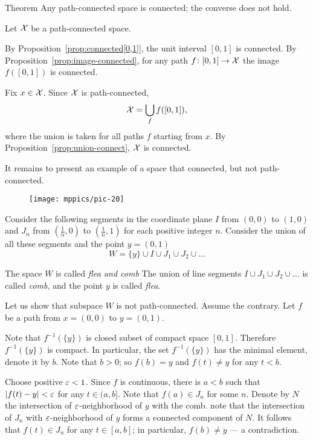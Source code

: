 \begin{thm}{Theorem}\label{thm:conncted/path-connected}
Any path-connected space is connected;
the converse does not hold.
\end{thm}

Let $\mathcal{X}$ be a path-connected space.

By Proposition~\ref{prop:connected[0,1]}, the unit interval $[0,1]$ is connected.
By Proposition~\ref{prop:image-connected}, for any path $f\colon[0,1]\to \mathcal{X}$ the image $f([0,1])$ is connected.

Fix $x\in \mathcal{X}$. 
Since $\mathcal{X}$ is path-connected, 
\[\mathcal{X}=\bigcup_f f([0,1]),\]
where the union is taken for all paths $f$ starting from $x$.
By Proposition~\ref{prop:union-connect}, $\mathcal{X}$ is connected.


It remains to present an example of a space that connected, but not path-connected.

\begin{wrapfigure}{r}{33mm}
\texttt{[image: mppics/pic-20]}
\end{wrapfigure}

Consider the following segments in the coordinate plane
$I$ from $(0,0)$ to $(1,0)$ 
and $J_n$ from $(\tfrac1n,0)$ to $(\tfrac1n,1)$ for each positive integer $n$.
Consider the union of all these segments and the point $y=(0,1)$
\[W=\{y\}\cup I\cup J_1\cup J_2 \cup \dots\]

The space $W$ is called \emph{flea and comb}
The union of line segments $I\cup J_1\cup J_2 \cup \dots$ is called \emph{comb},
and the point $y$ is called \emph{flea}.

Let us show that subspace $W$ is not path-connected.
Assume the contrary. 
Let $f$ be a path from $x=(0,0)$ to $y=(0,1)$.

Note that $f^{-1}(\{y\})$ is closed subset of compact space $[0,1]$.
Therefore $f^{-1}(\{y\})$ is compact.
In particular, the set $f^{-1}(\{y\})$ has the minimal element,
denote it by $b$.
Note that $b>0$; so $f(b)=y$ and $f(t)\ne y$ for any $t<b$.

Choose positive $\varepsilon<1$.
Since $f$ is continuous, there is $a<b$ such that $|f(t)-y|<\varepsilon$ for any $t\in (a,b]$.
Note that $f(a)\in J_n$ for some $n$.
Denote by $N$ the intersection of $\varepsilon$-neighborhood of $y$ with the comb.
note that the intersection of $J_n$ with $\varepsilon$-neighborhood of $y$ forms a connected component of $N$.
It follows that $f(t)\in J_n$ for any $t\in [a,b]$;
in particular, $f(b)\ne y$ --- a contradiction.
\qeds


